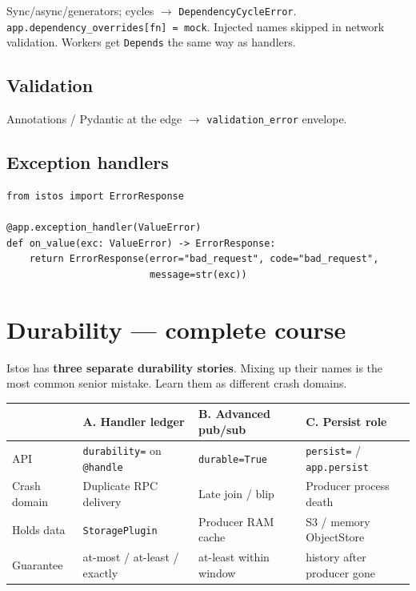 \documentclass[11pt,a4paper]{article}
\begin{document}
Sync/async/generators; cycles $\to$ \texttt{DependencyCycleError}.
\texttt{app.dependency\_overrides[fn] = mock}. Injected names skipped in network
validation. Workers get \texttt{Depends} the same way as handlers.

\subsection{Validation}

Annotations / Pydantic at the edge $\to$ \texttt{validation\_error} envelope.

\subsection{Exception handlers}

\begin{lstlisting}
from istos import ErrorResponse

@app.exception_handler(ValueError)
def on_value(exc: ValueError) -> ErrorResponse:
    return ErrorResponse(error="bad_request", code="bad_request",
                         message=str(exc))
\end{lstlisting}

\section{Durability --- complete course}
\label{sec:durability}

Istos has \textbf{three separate durability stories}. Mixing up their names is the
most common senior mistake. Learn them as different crash domains.

\begin{center}
\begin{tabularx}{\textwidth}{@{}lXXX@{}}
\toprule
 & \textbf{A. Handler ledger} & \textbf{B. Advanced pub/sub} & \textbf{C. Persist role} \\
\midrule
API & \texttt{durability=} on \texttt{@handle} & \texttt{durable=True} & \texttt{persist=} / \texttt{app.persist} \\
Crash domain & Duplicate RPC delivery & Late join / blip & Producer process death \\
Holds data & \texttt{StoragePlugin} & Producer RAM cache & S3 / memory ObjectStore \\
Guarantee & at-most / at-least / exactly & at-least within window & history after producer gone \\
\bottomrule
\end{tabularx}
\end{center}
\end{document}
